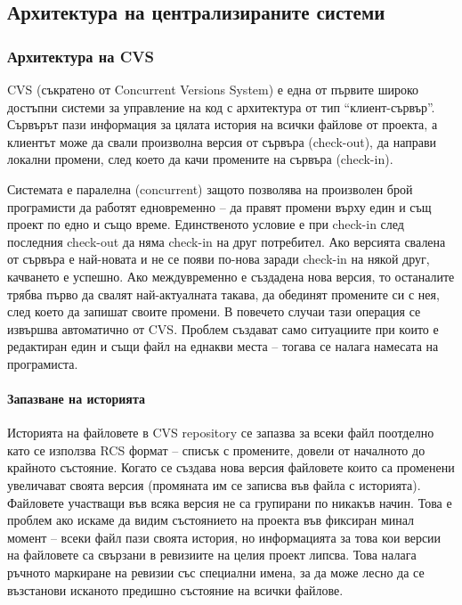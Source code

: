 \documentclass[a4paper]{article}
\begin{document}
  \subsection{Архитектура на централизираните системи}
    \subsubsection{Архитектура на CVS}

    CVS (съкратено от Concurrent Versions System) е една от първите широко
    достъпни системи за управление на код с архитектура от тип
    ``клиент-сървър''\cite{client-server}. Сървърът пази информация за цялата
    история на всички файлове от проекта, а клиентът може да свали произволна
    версия от сървъра (check-out), да направи локални промени, след което да
    качи промените на сървъра (check-in).

    Системата е паралелна (concurrent) защото позволява на произволен брой
    програмисти да работят едновременно -- да правят промени върху един и същ
    проект по едно и също време. Единственото условие е при check-in след
    последния check-out да няма check-in на друг потребител. Ако версията
    свалена от сървъра е най-новата и не се появи по-нова заради check-in на
    някой друг, качването е успешно. Ако междувременно е създадена нова версия,
    то останалите трябва първо да свалят най-актуалната такава, да обединят
    промените си с нея, след което да запишат своите промени. В повечето случаи
    тази операция се извършва автоматично от CVS.  Проблем създават само
    ситуациите при които е редактиран един и същи файл на еднакви места --
    тогава се налага намесата на програмиста.

      \paragraph{Запазване на историята}

      Историята на файловете в CVS repository се запазва за всеки файл
      поотделно като се използва RCS формат -- списък с промените, довели от
      началното до крайното състояние. Когато се създава нова версия файловете
      които са променени увеличават своята версия (промяната им се записва във
      файла с историята). Файловете участващи във всяка версия не са групирани
      по никакъв начин. Това е проблем ако искаме да видим състоянието на
      проекта във фиксиран минал момент -- всеки файл пази своята история, но
      информацията за това кои версии на файловете са свързани в ревизиите на
      целия проект липсва. Това налага ръчното маркиране на ревизии със
      специални имена, за да може лесно да се възстанови исканото предишно
      състояние на всички файлове.
\end{document}

